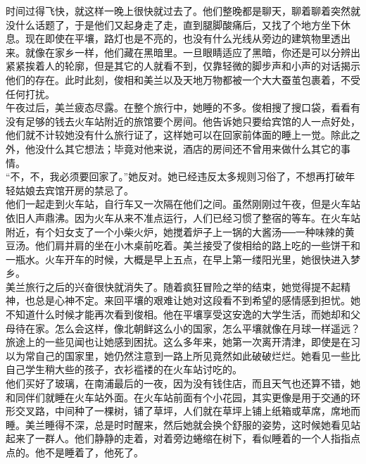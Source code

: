 时间过得飞快，就这样一晚上很快就过去了。他们整晚都是聊天，聊着聊着突然就没什么话题了，于是他们又起身走了走，直到腿脚酸痛后，又找了个地方坐下休息。现在即使在平壤，路灯也是不亮的，也没有什么光线从旁边的建筑物里透出来。就像在家乡一样，他们藏在黑暗里。一旦眼睛适应了黑暗，你还是可以分辨出紧紧挨着人的轮廓，但是其它的人就看不到，仅靠轻微的脚步声和小声的对话揭示他们的存在。此时此刻，俊相和美兰以及天地万物都被一个大大蚕茧包裹着，不受任何打扰。\\

午夜过后，美兰疲态尽露。在整个旅行中，她睡的不多。俊相搜了搜口袋，看看有没有足够的钱去火车站附近的旅馆要个房间。他告诉她只要给宾馆的人一点好处，他们就不计较她没有什么旅行证了，这样她可以在回家前体面的睡上一觉。除此之外，他没什么其它想法；毕竟对他来说，酒店的房间还不曾用来做什么其它的事情。\\

“不，不，我必须要回家了。”她反对。她已经违反太多规则习俗了，不想再打破年轻姑娘去宾馆开房的禁忌了。\\

他们一起走到火车站，自行车又一次隔在他们之间。虽然刚刚过午夜，但是火车站依旧人声鼎沸。因为火车从来不准点运行，人们已经习惯了整宿的等车。在火车站附近，有个妇女支了一个小柴火炉，她搅着炉子上一锅的大酱汤──一种味辣的黄豆汤。他们肩并肩的坐在小木桌前吃着。美兰接受了俊相给的路上吃的一些饼干和一瓶水。火车开车的时候，大概是早上五点，在早上第一缕阳光里，她很快进入梦乡。\\

美兰旅行之后的兴奋很快就消失了。随着疯狂冒险之举的结束，她觉得提不起精神，也总是心神不定。来回平壤的艰难让她对这段看不到希望的感情感到担忧。她不知道什么时候才能再次看到俊相。他在平壤享受这安逸的大学生活，而她却和父母待在家。怎么会这样，像北朝鲜这么小的国家，怎么平壤就像在月球一样遥远？\\

旅途上的一些见闻也让她感到困扰。这么多年来，她第一次离开清津，即使是在习以为常自己的国家里，她仍然注意到一路上所见竟然如此破破烂烂。她看见一些比自己学生稍大些的孩子，衣衫褴褛的在火车站讨吃的。\\

他们买好了玻璃，在南浦最后的一夜，因为没有钱住店，而且天气也还算不错，她和同伴们就睡在火车站外面。在火车站前面有个小花园，其实更像是用于交通的环形交叉路，中间种了一棵树，铺了草坪，人们就在草坪上铺上纸箱或草席，席地而睡。美兰睡得不深，总是时时醒来，然后她就会换个舒服的姿势，这时候她看见站起来了一群人。他们静静的走着，对着旁边蜷缩在树下，看似睡着的一个人指指点点的。他不是睡着了，他死了。\\

